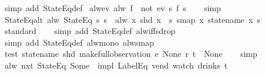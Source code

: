 \begin{isabellebody}
\isamarkupfalse%
\ {\isacharparenleft}simp\ add{\isacharcolon}\ StateEq{\isacharunderscore}def{\isacharparenright}%
\endisatagproof
{\isafoldproof}%
%
\isadelimproof
\isanewline
%
\endisadelimproof
\isanewline
{}\isamarkupfalse%
\ alw{\isacharunderscore}ev{\isacharcolon}\ {\isachardoublequoteopen}alw\ f\ {\isacharequal}\ not\ {\isacharparenleft}ev\ {\isacharparenleft}{\isasymlambda}s{\isachardot}\ {\isasymnot}f\ s{\isacharparenright}{\isacharparenright}{\isachardoublequoteclose}\isanewline
%
\isadelimproof
\ \ %
\endisadelimproof
%
\isatagproof
{}\isamarkupfalse%
\ simp%
\endisatagproof
{\isafoldproof}%
%
\isadelimproof
\isanewline
%
\endisadelimproof
\isanewline
{}\isamarkupfalse%
\ StateEq{\isacharunderscore}alt{\isacharcolon}\ {\isachardoublequoteopen}alw\ {\isacharparenleft}StateEq\ s{\isacharparenright}\ s{\isacharprime}\ {\isacharequal}\ alw\ {\isacharparenleft}{\isasymlambda}x{\isachardot}\ shd\ x\ {\isacharequal}\ s{\isacharparenright}\ {\isacharparenleft}smap\ {\isacharparenleft}{\isasymlambda}x{\isachardot}\ statename\ x{\isacharparenright}\ s{\isacharprime}{\isacharparenright}{\isachardoublequoteclose}\isanewline
%
\isadelimproof
\ \ %
\endisadelimproof
%
\isatagproof
{}\isamarkupfalse%
\ standard\isanewline
\ \ \isamarkupfalse%
\ {\isacharparenleft}simp\ add{\isacharcolon}\ StateEq{\isacharunderscore}def\ alw{\isacharunderscore}iff{\isacharunderscore}sdrop{\isacharparenright}\isanewline
\ \ \isamarkupfalse%
\ {\isacharparenleft}simp\ add{\isacharcolon}\ StateEq{\isacharunderscore}def\ alw{\isacharunderscore}mono\ alw{\isacharunderscore}smap{\isacharparenright}%
\endisatagproof
{\isafoldproof}%
%
\isadelimproof
\isanewline
%
\endisadelimproof
\isanewline
{}\isamarkupfalse%
\ test{\isacharcolon}\ {\isachardoublequoteopen}statename\ {\isacharparenleft}shd\ {\isacharparenleft}make{\isacharunderscore}full{\isacharunderscore}observation\ e\ None\ r\ t{\isacharparenright}{\isacharparenright}\ {\isacharequal}\ None{\isachardoublequoteclose}\isanewline
%
\isadelimproof
\ \ %
\endisadelimproof
%
\isatagproof
{}\isamarkupfalse%
\ simp%
\endisatagproof
{\isafoldproof}%
%
\isadelimproof
\isanewline
%
\endisadelimproof
\isanewline
{}\isamarkupfalse%
\ {\isachardoublequoteopen}alw\ {\isacharparenleft}nxt\ {\isacharparenleft}StateEq\ {\isacharparenleft}Some\ {}{\isacharparenright}{\isacharparenright}\ impl\ {\isacharparenleft}LabelEq\ {\isacharprime}{\isacharprime}vend{\isacharprime}{\isacharprime}{\isacharparenright}{\isacharparenright}\ {\isacharparenleft}watch\ drinks\ t{\isacharparenright}{\isachardoublequoteclose}\isanewline

\end{isabellebody}
